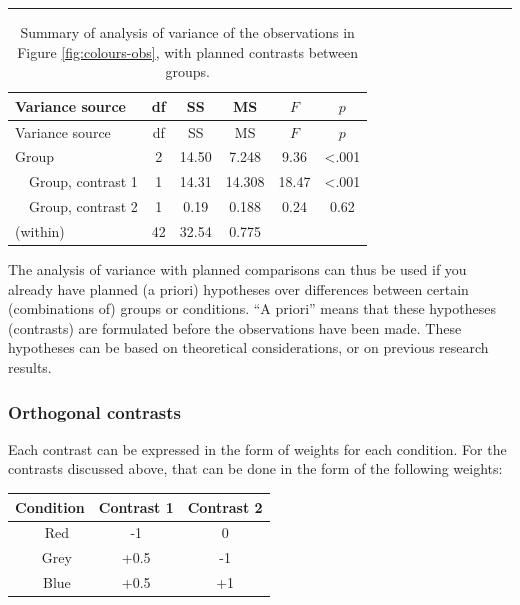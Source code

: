 \documentclass[
]{book}
\begin{document}
\begin{center}\rule{0.5\linewidth}{0.5pt}\end{center}

\begin{longtable}[]{@{}lccccc@{}}
\caption{\label{tab:colours-anova-contrast} Summary of analysis of variance of the observations in Figure \ref{fig:colours-obs}, with planned contrasts between groups.}\tabularnewline
\toprule\noalign{}
Variance source & df & SS & MS & \(F\) & \(p\) \\
\midrule\noalign{}
\endfirsthead
\toprule\noalign{}
Variance source & df & SS & MS & \(F\) & \(p\) \\
\midrule\noalign{}
\endhead
\bottomrule\noalign{}
\endlastfoot
Group & 2 & 14.50 & 7.248 & 9.36 & \textless.001 \\
~~Group, contrast 1 & 1 & 14.31 & 14.308 & 18.47 & \textless.001 \\
~~Group, contrast 2 & 1 & 0.19 & 0.188 & 0.24 & 0.62 \\
(within) & 42 & 32.54 & 0.775 & & \\
\end{longtable}

The analysis of variance with planned comparisons can thus be used
if you already have planned (a priori) hypotheses over differences between
certain (combinations of) groups or conditions. ``A priori'' means that these
hypotheses (contrasts) are formulated before the observations have been made.
These hypotheses can be based on theoretical considerations, or on
previous research results.

\hypertarget{orthogonal-contrasts}{%
\subsubsection{Orthogonal contrasts}\label{orthogonal-contrasts}}

Each contrast can be expressed in the form of weights for each
condition. For the contrasts discussed above, that can be done
in the form of the following weights:

\begin{longtable}[]{@{}ccc@{}}
\toprule\noalign{}
Condition & Contrast 1 & Contrast 2 \\
\midrule\noalign{}
\endhead
\bottomrule\noalign{}
\endlastfoot
~~Red & -1 & 0 \\
~~Grey & +0.5 & -1 \\
~~Blue & +0.5 & +1 \\
\end{longtable}
\end{document}
